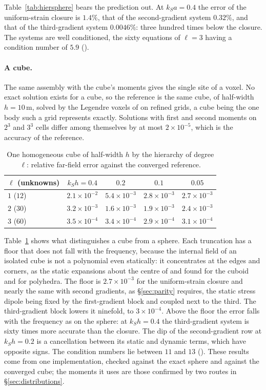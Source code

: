 \documentclass[11pt,a4paper]{article}
\begin{document}
Table~\ref{tab:hiersphere} bears the prediction out. At $k_Sa=0.4$ the error of the uniform-strain
closure is $1.4\%$, that of the second-gradient system $0.32\%$, and that of the third-gradient system
$0.0046\%$: three hundred times below the closure. The systems are well conditioned, the sixty
equations of $\ell=3$ having a condition number of $5.9$
().

\paragraph{A cube.} The same assembly with the cube's moments gives the single site of a voxel. No
exact solution exists for a cube, so the reference is the same cube, of half-width $h=10$\,m, solved by
the Legendre voxels of \citet{NestorError2026} on refined grids, a cube being the one body such a grid
represents exactly. Solutions with first and second moments on $2^3$ and $3^3$ cells differ among
themselves by at most $2\times10^{-5}$, which is the accuracy of the reference.
\begin{table}[htbp]
\centering
\caption{One homogeneous cube of half-width $h$ by the hierarchy of degree $\ell$: relative far-field
error against the converged reference.}\label{tab:hiercube}
\small
\begin{tabular}{@{}lcccc@{}}
\toprule
$\ell$ (unknowns) & $k_Sh=0.4$ & $0.2$ & $0.1$ & $0.05$ \\
\midrule
$1$ ($12$) & $2.1\times10^{-2}$ & $5.4\times10^{-3}$ & $2.8\times10^{-3}$ & $2.7\times10^{-3}$ \\
$2$ ($30$) & $3.2\times10^{-3}$ & $1.6\times10^{-3}$ & $1.9\times10^{-3}$ & $2.4\times10^{-3}$ \\
$3$ ($60$) & $3.5\times10^{-4}$ & $3.4\times10^{-4}$ & $2.9\times10^{-4}$ & $3.1\times10^{-4}$ \\
\bottomrule
\end{tabular}
\end{table}
Table~\ref{tab:hiercube} shows what distinguishes a cube from a sphere. Each truncation has a floor that
does not fall with the frequency, because the internal field of an isolated cube is not a polynomial
even statically: it concentrates at the edges and corners, as the static expansions about the centre
of \citet{Johnson1980b} and \citet{WuZhangYin2021} found for the cuboid and for polyhedra. The floor is $2.7\times10^{-3}$ for the
uniform-strain closure and nearly the same with second gradients, as \S\ref{sec:parity} requires, the
static stress dipole being fixed by the first-gradient block and coupled next to the third. The
third-gradient block lowers it ninefold, to $3\times10^{-4}$. Above the floor the error falls with the
frequency as on the sphere: at $k_Sh=0.4$ the third-gradient system is sixty times more accurate than
the closure. The dip of the second-gradient row at $k_Sh=0.2$ is a cancellation between its static and
dynamic terms, which have opposite signs. The condition numbers lie between $11$ and $13$
(). These results come from one implementation,
checked against the exact sphere and against the converged cube; the moments it uses are those
confirmed by two routes in \S\ref{sec:distributions}.
\end{document}
